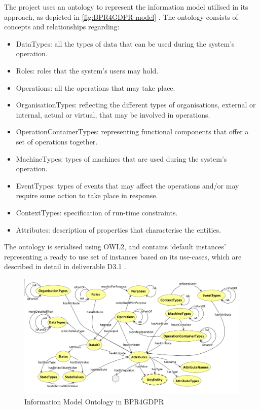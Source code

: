 The project uses an ontology to represent the information model utilised in its approach, as depicted in \autoref{fig:BPR4GDPR-model} \cite{lioudakis_d3.1_2019}. The ontology consists of concepts and relationships regarding:
\begin{itemize}
    \item DataTypes: all the types of data that can be used during the system's operation.
    \item Roles: roles that the system's users may hold.
    \item Operations: all the operations that may take place.
    \item OrganisationTypes: reflecting the different types of organisations, external or internal, actual or virtual, that may be involved in operations.
    \item OperationContainerTypes: representing functional components that offer a set of operations together.
    \item MachineTypes: types of machines that are used during the system's operation.
    \item EventTypes: types of events that may affect the operations and/or may require some action to take place in response.
    \item ContextTypes: specification of run-time constraints.
    \item Attributes: description of properties that characterise the entities.
\end{itemize}
The ontology is serialised using OWL2, and contains `default instances' representing a ready to use set of instances based on its use-cases, which are described in detail in deliverable D3.1 \cite{lioudakis_d3.1_2019}. 
\begin{figure}[htbp]
    \centering
    \includegraphics[width=\linewidth]{img/BPR4GDPR_model.png}
    \caption{Information Model Ontology in BPR4GDPR \cite{lioudakis_d3.1_2019}}
    \label{fig:BPR4GDPR-model}
\end{figure}

